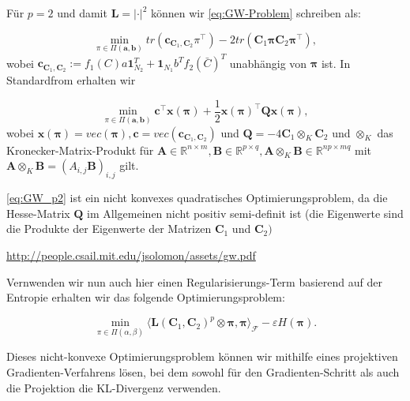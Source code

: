 \documentclass[11pt,a4paper]{article}
\numberwithin{equation}{section}
\begin{document}
	Für $p=2$ und damit $\boldsymbol{L}=|\cdot|^2$ können wir \autoref{eq:GW-Problem} schreiben als:
	
	\begin{equation}
	\min_{\pi \in \Pi(\boldsymbol{a}, \boldsymbol{b})}{tr(\boldsymbol{c}_{\boldsymbol{C}_1,  \boldsymbol{C}_2}\pi^\top) - 2 tr(\boldsymbol{C}_1\boldsymbol{\pi}\boldsymbol{C}_2\boldsymbol{\pi}^\top)},
	\end{equation}
	wobei $\boldsymbol{c}_{\boldsymbol{C}_1,  \boldsymbol{C}_2}:= f_1(C)a \boldsymbol{1}_{N_2}^T + \boldsymbol{1}_{N_1}b^Tf_2(\bar{C})^T$ unabhängig von $\boldsymbol{\pi}$ ist.	
	In Standardfrom erhalten wir
	
	\begin{equation}
	\min_{\pi \in \Pi(\boldsymbol{a}, \boldsymbol{b})}{\boldsymbol{c}^\top \boldsymbol{x}(\boldsymbol{\pi}) + \frac{1}{2}\boldsymbol{x}(\boldsymbol{\pi})^\top \boldsymbol{Q}\boldsymbol{x}(\boldsymbol{\pi})},	 \label{eq:GW_p2}		
	\end{equation}
	wobei $\boldsymbol{x}(\boldsymbol{\pi}) = vec(\boldsymbol{\pi}), \boldsymbol{c}= vec(\boldsymbol{c}_{\boldsymbol{C}_1, \boldsymbol{C}_2})$ und $\boldsymbol{Q} = -4 \boldsymbol{C}_1 \otimes_K \boldsymbol{C}_2$ und $\otimes_K$ das Kronecker-Matrix-Produkt für $\boldsymbol{A} \in \mathbb{R}^{n\times m}, \boldsymbol{B} \in \mathbb{R}^{p\times q}, \boldsymbol{A}\otimes_K \boldsymbol{B} \in \mathbb{R}^{np \times mq}$ mit $\boldsymbol{A} \otimes_K \boldsymbol{B} = (A_{i,j}\boldsymbol{B})_{i,j}$ gilt.
	
	\autoref{eq:GW_p2} ist ein nicht konvexes quadratisches Optimierungsproblem, da die Hesse-Matrix $\boldsymbol{Q}$ im Allgemeinen nicht positiv semi-definit ist (die Eigenwerte sind die Produkte der Eigenwerte der Matrizen $\boldsymbol{C}_1$ und $\boldsymbol{C}_2)$
	
	\url{http://people.csail.mit.edu/jsolomon/assets/gw.pdf}
	
	Vernwenden wir nun auch hier einen Regularisierungs-Term basierend auf der Entropie erhalten wir das folgende Optimierungsproblem:
	
	\begin{equation}
	\min_{\pi \in \Pi (\alpha , \beta)}{\langle \boldsymbol{L}(\boldsymbol{C}_1, \boldsymbol{C}_2)^p \otimes \boldsymbol{\pi}, \boldsymbol{\pi} \rangle_\mathcal{F} - \varepsilon H(\boldsymbol{\pi})}.
	\end{equation}
	
	Dieses nicht-konvexe Optimierungsproblem können wir mithilfe eines projektiven Gradienten-Verfahrens lösen, bei dem sowohl für den Gradienten-Schritt als auch die Projektion die KL-Divergenz verwenden.
	
\end{document}
